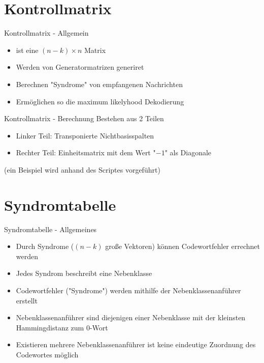 \documentclass{beamer}
\begin{document}
  \section{Kontrollmatrix}
  \begin{frame}{Kontrollmatrix - Allgemein}
  \begin{itemize}
	  \item ist eine $(n-k) \times n$ Matrix
	  \item Werden von Generatormatrizen generiret
	  \item Berechnen "Syndrome" \space von empfangenen Nachrichten
	  \item Ermöglichen so die maximum likelyhood Dekodierung
  \end{itemize}
  \end{frame}
  
  \begin{frame}{Kontrollmatrix - Berechnung}
    Bestehen aus 2 Teilen
    \begin{itemize}
		\item Linker Teil: \newline Transponierte Nichtbasisspalten
		\item Rechter Teil: \newline Einheitsmatrix mit dem Wert "$-1$" \space als Diagonale
  	\end{itemize}
	(ein Beispiel wird anhand des Scriptes vorgeführt)
  \end{frame}
  
  
  \section{Syndromtabelle}
  \begin{frame}{Syndromtabelle - Allgemeines}
	  \begin{itemize}
	  \item Durch Syndrome ($(n - k)$ große Vektoren) können Codewortfehler errechnet werden
	  \item Jedes Syndrom beschreibt eine Nebenklasse
	  \item Codewortfehler ("Syndrome") werden mithilfe der Nebenklassenanführer erstellt
	  \item Nebenklassenanführer sind diejenigen einer Nebenklasse mit der kleinsten Hammingdistanz zum 0-Wort
	  \item Existieren mehrere Nebenklassenanführer ist keine eindeutige Zuordnung des Codewortes möglich
	  \end{itemize}
  \end{frame}
  
\end{document}
